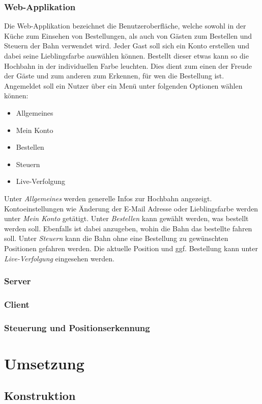 \subsection{Web-Applikation}
Die Web-Applikation bezeichnet die Benutzeroberfläche, welche sowohl in der Küche zum Einsehen von Bestellungen, als auch von Gästen zum Bestellen und Steuern der Bahn verwendet wird. Jeder Gast soll sich ein Konto erstellen und dabei seine Lieblingsfarbe auswählen können.
Bestellt dieser etwas kann so die Hochbahn in der individuellen Farbe leuchten. Dies dient zum einen der Freude der Gäste und zum anderen zum Erkennen, für wen die Bestellung ist. Angemeldet soll ein Nutzer über ein Menü unter folgenden Optionen
wählen können:
\begin{itemize}
	\item Allgemeines
	\item Mein Konto
	\item Bestellen
	\item Steuern
	\item Live-Verfolgung
\end{itemize}
Unter \textit{Allgemeines} werden generelle Infos zur Hochbahn angezeigt. Kontoeinstellungen wie Änderung der E-Mail Adresse oder Lieblingsfarbe werden unter \textit{Mein Konto} getätigt. Unter \textit{Bestellen} kann gewählt werden, was bestellt werden soll.
Ebenfalls ist dabei anzugeben, wohin die Bahn das bestellte fahren soll. Unter \textit{Steuern} kann die Bahn ohne eine Bestellung zu gewünschten Positionen gefahren werden. Die aktuelle Position und ggf. Bestellung kann unter \textit{Live-Verfolgung} eingesehen werden.
\subsection{Server}
\subsection{Client}
\subsection{Steuerung und Positionserkennung}

\chapter{Umsetzung}
\section{Konstruktion}
